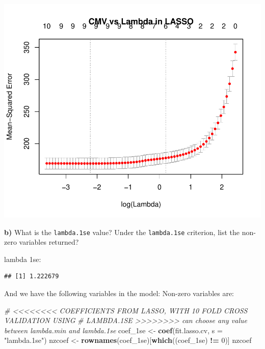 \documentclass[]{article}
\newenvironment{Shaded}{\begin{snugshade}}{\end{snugshade}}
\newcommand{\KeywordTok}[1]{\textcolor[rgb]{0.13,0.29,0.53}{\textbf{#1}}}
\newcommand{\DataTypeTok}[1]{\textcolor[rgb]{0.13,0.29,0.53}{#1}}
\newcommand{\DecValTok}[1]{\textcolor[rgb]{0.00,0.00,0.81}{#1}}
\newcommand{\StringTok}[1]{\textcolor[rgb]{0.31,0.60,0.02}{#1}}
\newcommand{\CommentTok}[1]{\textcolor[rgb]{0.56,0.35,0.01}{\textit{#1}}}
\newcommand{\OperatorTok}[1]{\textcolor[rgb]{0.81,0.36,0.00}{\textbf{#1}}}
\newcommand{\NormalTok}[1]{#1}
\begin{document}
\begin{flushleft}\includegraphics{Midterm_11_01_2016_Answers_files/figure-latex/unnamed-chunk-32-2} \end{flushleft}

\textbf{b)} What is the \texttt{lambda.1se} value? Under the
\texttt{lambda.1se} criterion, list the non-zero variables returned?

lambda 1se:

\begin{Shaded}
\end{Shaded}

\begin{verbatim}
## [1] 1.222679
\end{verbatim}

\begin{Shaded}
\end{Shaded}

And we have the following variables in the model: Non-zero variables
are:

\begin{Shaded}
\begin{Highlighting}[]
\CommentTok{# <<<<<<<< COEFFICIENTS FROM LASSO, WITH 10 FOLD CROSS VALIDATION USING}
\CommentTok{# LAMBDA.1SE >>>>>>>> can choose any value between lambda.min and lambda.1se}
\NormalTok{coef_1se <-}\StringTok{ }\KeywordTok{coef}\NormalTok{(fit.lasso.cv, }\DataTypeTok{s =} \StringTok{"lambda.1se"}\NormalTok{)}
\NormalTok{nzcoef <-}\StringTok{ }\KeywordTok{rownames}\NormalTok{(coef_1se)[}\KeywordTok{which}\NormalTok{((coef_1se) }\OperatorTok{!=}\StringTok{ }\DecValTok{0}\NormalTok{)]}
\NormalTok{nzcoef}
\end{Highlighting}
\end{Shaded}
\end{document}
